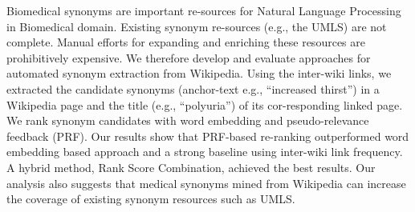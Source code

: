 Biomedical synonyms are important re-sources for Natural Language Processing in Biomedical domain. Existing synonym re-sources (e.g., the UMLS) are not complete. Manual efforts for expanding and enriching these resources are prohibitively expensive. We therefore develop and evaluate approaches for automated synonym extraction from Wikipedia. Using the inter-wiki links, we extracted the candidate synonyms (anchor-text e.g., ``increased thirst'') in a Wikipedia page and the title (e.g., ``polyuria'') of its cor-responding linked page. We rank synonym candidates with word embedding and pseudo-relevance feedback (PRF). Our results show that PRF-based re-ranking outperformed word embedding based approach and a strong baseline using inter-wiki link frequency. A hybrid method, Rank Score Combination, achieved the best results. Our analysis also suggests that medical synonyms mined from Wikipedia can increase the coverage of existing synonym resources such as UMLS.

